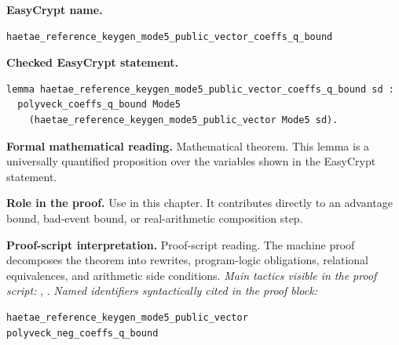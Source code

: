 \begin{formaltheorem}
\noindent\textbf{EasyCrypt name.}
\begin{lstlisting}[language=EasyCrypt,basicstyle=\ttfamily\scriptsize]
haetae_reference_keygen_mode5_public_vector_coeffs_q_bound
\end{lstlisting}
\noindent\textbf{Checked EasyCrypt statement.}
\begin{lstlisting}[language=EasyCrypt,basicstyle=\ttfamily\scriptsize]
lemma haetae_reference_keygen_mode5_public_vector_coeffs_q_bound sd :
  polyveck_coeffs_q_bound Mode5
    (haetae_reference_keygen_mode5_public_vector Mode5 sd).
\end{lstlisting}
\noindent\textbf{Formal mathematical reading.}
Mathematical theorem. This lemma is a universally quantified proposition over the variables shown in the EasyCrypt statement.

\noindent\textbf{Role in the proof.}
Use in this chapter. It contributes directly to an advantage bound, bad-event bound, or real-arithmetic composition step.

\noindent\textbf{Proof-script interpretation.}
Proof-script reading. The machine proof decomposes the theorem into rewrites, program-logic obligations, relational equivalences, and arithmetic side conditions.
\emph{Main tactics visible in the proof script:} , .
\emph{Named identifiers syntactically cited in the proof block:}
\begin{lstlisting}[language=EasyCrypt,basicstyle=\ttfamily\scriptsize]
haetae_reference_keygen_mode5_public_vector
polyveck_neg_coeffs_q_bound
\end{lstlisting}

\end{formaltheorem}


